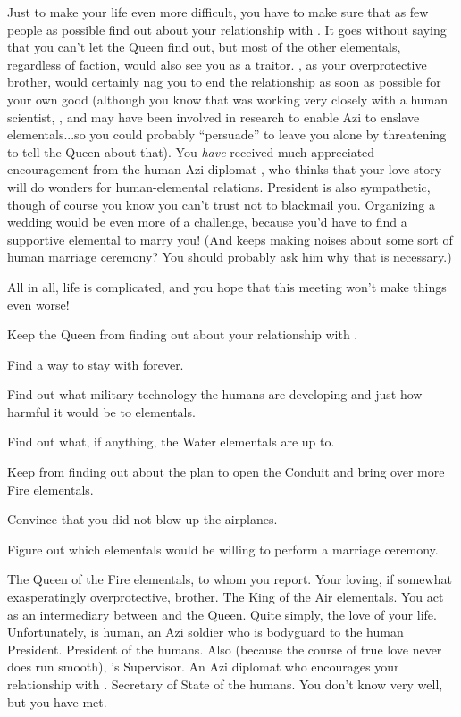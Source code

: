 \documentclass[char]{elementals}
\begin{document}
Just to make your life even more difficult, you have to make sure that as few people as possible find out about your relationship with \cRomeo{}.  It goes without saying that you can't let the Queen find out, but most of the other elementals, regardless of faction, would also see you as a traitor.  \cPyro{}, as your overprotective brother, would certainly nag you to end the relationship as soon as possible for your own good (although you know that \cPyro{\they} was working very closely with a human scientist, \cMS{\intro}, and may have been involved in research to enable Azi to enslave elementals...so you could probably ``persuade'' \cPyro{\them} to leave you alone by threatening to tell the Queen about that).  You \emph{have} received much-appreciated encouragement from the human Azi diplomat \cDiplomat{\intro}, who thinks that your love story will do wonders for human-elemental relations.  President \cLeader{} is also sympathetic, though of course you know you can't trust \cLeader{\them} not to blackmail you.  Organizing a wedding would be even more of a challenge, because you'd have to find a supportive elemental to marry you!  (And \cRomeo{} keeps making noises about some sort of human marriage ceremony?  You should probably ask him why that is necessary.)

All in all, life is complicated, and you hope that this meeting won't make things even worse!

\begin{itemz}[Goals]
  \item Keep the Queen from finding out about your relationship with \cRomeo{}.
  \item Find a way to stay with \cRomeo{} forever.
  \item Find out what military technology the humans are developing and just how harmful it would be to elementals.
  \item Find out what, if anything, the Water elementals are up to.
  \item Keep \cRomeo{} from finding out about the plan to open the Conduit and bring over more Fire elementals.
  \item Convince \cRomeo{} that you did not blow up the airplanes.
  \item Figure out which elementals would be willing to perform a marriage ceremony.
\end{itemz}

\begin{contacts}
  \contact{\cQueen{}} The Queen of the Fire elementals, to whom you report.
  \contact{\cPyro{}} Your loving, if somewhat exasperatingly overprotective, brother.
  \contact{\cKing{}} The King of the Air elementals.  You act as an intermediary between \cKing{\them} and the Queen.
  \contact{\cRomeo{}} Quite simply, the love of your life.  Unfortunately, \cRomeo{\they} is human, an Azi soldier who is bodyguard to the human President.
  \contact{\cLeader{}} President of the humans.  Also (because the course of true love never does run smooth), \cRomeo{}'s Supervisor.
  \contact{\cDiplomat{}} An Azi diplomat who encourages your relationship with \cRomeo{}.
  \contact{\cDema{}} Secretary of State of the humans.  You don't know \cDema{\them} very well, but you have met.
\end{contacts}
\end{document}
